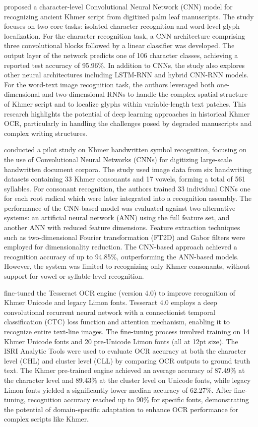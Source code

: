 \citet{Valy_8563219} proposed a character-level Convolutional Neural 
Network (CNN) model for recognizing ancient Khmer script from digitized 
palm leaf manuscripts. The study focuses on two core tasks: 
isolated character recognition and word-level glyph localization. 
For the character recognition task, a CNN architecture comprising 
three convolutional blocks followed by a linear classifier was 
developed. The output layer of the network predicts one of 106 
character classes, achieving a reported test accuracy of 95.96\%. 
In addition to CNNs, the study also explores other neural 
architectures including LSTM-RNN and hybrid CNN-RNN models. 
For the word-text image recognition task, the authors leveraged 
both one-dimensional and two-dimensional RNNs to handle the complex 
spatial structure of Khmer script and to localize glyphs within 
variable-length text patches. This research highlights the potential 
of deep learning approaches in historical Khmer OCR, particularly in 
handling the challenges posed by degraded manuscripts and complex 
writing structures.

\citet{Annanurov_2018} conducted a pilot study on Khmer handwritten 
symbol recognition, focusing on the use of Convolutional Neural 
Networks (CNNs) for digitizing large-scale handwritten document corpora. 
The study used image data from six handwriting datasets containing 
33 Khmer consonants and 17 vowels, forming a total of 561 syllables. 
For consonant recognition, the authors trained 33 individual CNNs one 
for each root radical which were later integrated into a recognition 
assembly. The performance of the CNN-based model was evaluated against 
two alternative systems: an artificial neural network (ANN) using the 
full feature set, and another ANN with reduced feature dimensions. 
Feature extraction techniques such as two-dimensional Fourier 
transformation (FT2D) and Gabor filters were employed for dimensionality 
reduction. The CNN-based approach achieved a recognition accuracy of 
up to 94.85\%, outperforming the ANN-based models. However, the system 
was limited to recognizing only Khmer consonants, without support for 
vowel or syllable-level recognition.

\citet{sokphyrum2019khmer} fine-tuned the Tesseract OCR engine 
(version 4.0) to improve recognition of Khmer Unicode and legacy 
Limon fonts. Tesseract 4.0 employs a deep convolutional recurrent 
neural network with a connectionist temporal classification (CTC) 
loss function and attention mechanism, enabling it to recognize entire 
text-line images. The fine-tuning process involved training on 14 Khmer 
Unicode fonts and 20 pre-Unicode Limon fonts (all at 12pt size). 
The ISRI Analytic Tools were used to evaluate OCR accuracy at both 
the character level (CHL) and cluster level (CLL) by comparing OCR 
outputs to ground truth text. The Khmer pre-trained engine achieved 
an average accuracy of 87.49\% at the character level and 89.43\% at 
the cluster level on Unicode fonts, while legacy Limon fonts yielded 
a significantly lower median accuracy of 62.27\%. After fine-tuning, 
recognition accuracy reached up to 90\% for specific fonts, demonstrating 
the potential of domain-specific adaptation to enhance OCR performance 
for complex scripts like Khmer.


